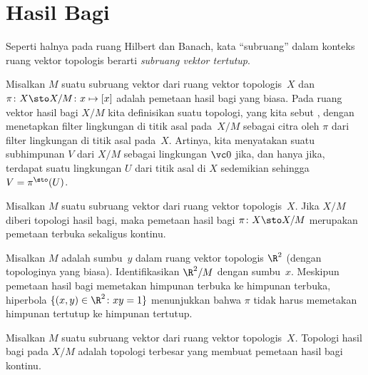 \section{Hasil Bagi}

\begin{conv} Seperti halnya pada ruang Hilbert dan Banach, kata ``subruang'' dalam konteks ruang vektor topologis
berarti \emph{subruang vektor tertutup}.
\end{conv}

\begin{defn} Misalkan $M$ suatu subruang vektor dari ruang vektor topologis~$X$ dan $\pi\colon X \sto X/M \colon x \mapsto [x]$
adalah pemetaan hasil bagi yang biasa. Pada ruang vektor hasil bagi $X/M$ kita definisikan suatu topologi, yang kita sebut
, dengan menetapkan filter lingkungan di titik asal pada~$X/M$ sebagai citra oleh $\pi$ dari
filter lingkungan di titik asal pada~$X$. Artinya, kita menyatakan suatu subhimpunan $V$ dari $X/M$ sebagai lingkungan $\vc 0$ jika,
dan hanya jika, terdapat suatu lingkungan $U$ dari titik asal di $X$ sedemikian sehingga $V = \pi^{\sto}(U)$.
\end{defn}

\begin{prop} Misalkan $M$ suatu subruang vektor dari ruang vektor topologis~$X$. Jika $X/M$ diberi topologi hasil bagi, maka
pemetaan hasil bagi $\pi\colon X \sto X/M$ merupakan pemetaan terbuka sekaligus kontinu.
\end{prop}

\begin{exam} Misalkan $M$ adalah sumbu~$y$ dalam ruang vektor topologis $\R^2$ (dengan topologinya yang biasa). Identifikasikan $\R^2/M$ dengan
sumbu~$x$. Meskipun pemetaan hasil bagi memetakan himpunan terbuka ke himpunan terbuka, hiperbola $\{(x,y) \in \R^2\colon xy = 1\}$ menunjukkan
bahwa $\pi$ tidak harus memetakan himpunan tertutup ke himpunan tertutup.
\end{exam}

\begin{prop}\label{prop_quotient_top_strong} Misalkan $M$ suatu subruang vektor dari ruang vektor topologis~$X$. Topologi hasil bagi
pada $X/M$ adalah topologi terbesar yang membuat pemetaan hasil bagi kontinu.
\end{prop}

